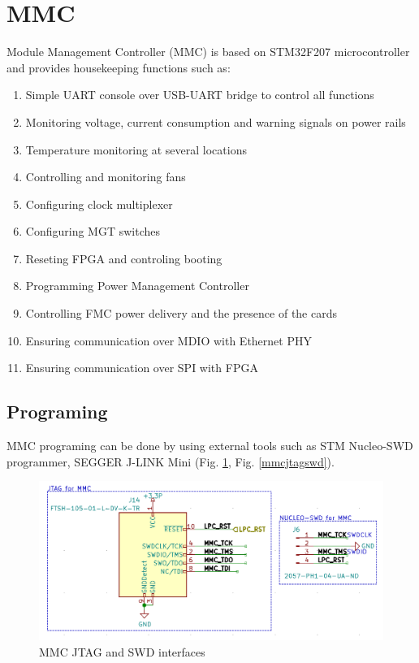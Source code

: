 \documentclass[12pt,oneside,a4]{article}
\begin{document}
\section{MMC}
Module Management Controller (MMC) is based on STM32F207 microcontroller and provides housekeeping functions such as:
\begin{enumerate}
	\item Simple UART console over USB-UART bridge to control all functions
	\item Monitoring voltage, current consumption and warning signals on power rails
	\item Temperature monitoring at several locations
	\item Controlling and monitoring fans
	\item Configuring clock multiplexer
	\item Configuring MGT switches
	\item Reseting FPGA and controling booting
	\item Programming Power Management Controller
	\item Controlling FMC power delivery and the presence of the cards
	\item Ensuring communication over MDIO with Ethernet PHY
	\item Ensuring communication over SPI with FPGA
\end{enumerate}

\subsection{Programing}
MMC programing can be done by using external tools such as STM Nucleo-SWD programmer, SEGGER J-LINK Mini (Fig. \ref{mmcjtag}, Fig. \ref{mmcjtagswd}).

\begin{figure}[H]
\begin{center}
\includegraphics[width=1\linewidth]{mmcjtag.png}
 \caption{MMC JTAG and SWD interfaces}\label{mmcjtag}
\end{center}
\end{figure}
\end{document}
